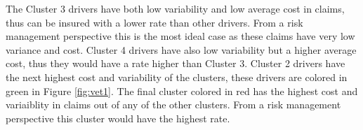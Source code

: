 \documentclass[11pt,letterpaper]{article}
\numberwithin{equation}{section}
\numberwithin{equation}{section}
\numberwithin{equation}{section}
\begin{document}
 The Cluster 3 drivers have both low variability and low average cost in claims, thus can be insured with a lower rate than other drivers. From a risk management perspective this is the most ideal case as these claims have very low variance and cost. Cluster 4 drivers have also low variability but a higher average cost, thus they would have a rate higher than Cluster 3. Cluster 2 drivers have the next highest cost and variability of the clusters, these drivers are colored in green in Figure \ref{fig:vet1}. The final cluster colored in red has the highest cost and variaiblity in claims out of any of the other clusters. From a risk management perspective this cluster would have the highest rate.
\begin{table}[!htb]
\centering
\caption{Summarized volatility information of each cluster for Claims.}
\label{table:volSev}
\end{table}
\end{document}
